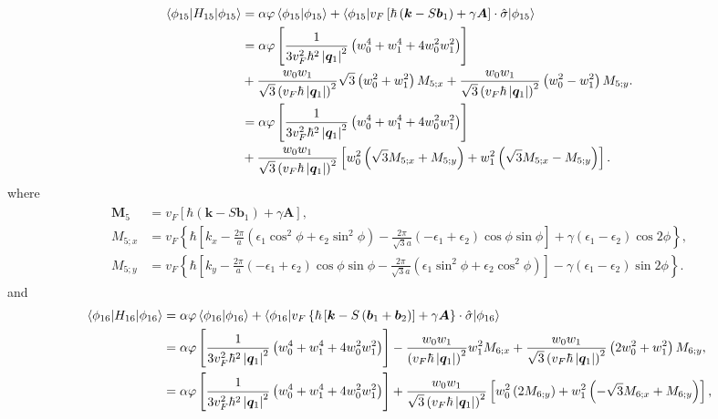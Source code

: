 \documentclass[10pt, oneside]{article}
\newcommand{\vph}{\varphi}
\newcommand{\p}[1]{\left(#1\right)}
\newcommand{\bb}[1]{\left[#1\right]}
\newcommand{\br}[1]{\left\{#1\right\}}
\newcommand{\bv}[1]{\left|#1\right|}
\begin{document}
\begin{align}
	\begin{split}
		\braket{\phi_{15} | H_{15} | \phi_{15}} & = \alpha \vph \braket{\phi_{15} | \phi_{15}} + \braket{\phi_{15} | v_{F} \bb{\hbar \p{\bm{k} - S\bm{b}_{1}}+ \gamma \bm{A}}\cdot \hat{\sigma}| \phi_{15}}   \\
		& = \alpha \vph \bb{\frac{1}{3 v_{F}^{2} \hbar^{2} \bv{\bm{q}_{1}}^{2} }\p{w_{0}^{4} + w_{1}^{4} + 4 w_{0}^{2} w_{1}^{2}}} \\
		&+ \frac{w_0 w_1}{\sqrt{3} \p{v_{F} \hbar \bv{\bm{q}_{1}}}^2} \sqrt{3} \p{w_{0}^{2} + w_{1}^{2}}M_{5;x} + \frac{w_0 w_1}{\sqrt{{3}}\p{v_{F} \hbar \bv{\bm{q}_1}}^2} \p{w_0^2 - w_1^2} M_{5;y}. \\
		& = \alpha \vph \bb{\frac{1}{3 v_{F}^{2} \hbar^{2} \bv{\bm{q}_{1}}^{2} }\p{w_{0}^{4} + w_{1}^{4} + 4 w_{0}^{2} w_{1}^{2}}} \\
		& + \frac{w_0 w_1}{\sqrt{{3}}\p{v_{F} \hbar \bv{\bm{q}_1}}^2}\bb{ w_0^2 \p{\sqrt{3} M_{5;x} + M_{5;y}} + w_1^2 \p{\sqrt{3} M_{5;x} - M_{5;y}}}.
	\end{split}
\end{align}
where 
\begin{align}
	\begin{split}
		\bm{M}_{5} & =  v_{F} \bb{\hbar \p{\bm{k} - S\bm{b}_{1}}+ \gamma \bm{A}}, \\
		M_{5;x} & = v_{F} \br{\hbar \bb{k_{x} - \frac{2 \pi}{a} \p{\epsilon_{1} \cos^{2}{\phi} + \epsilon_{2} \sin^{2}{\phi}} - \frac{2 \pi}{\sqrt{3} a}\p{ - \epsilon_{1} + \epsilon_{2} } \cos{\phi} \sin{\phi}} + \gamma \p{\epsilon_{1} - \epsilon_{2}} \cos{2 \phi}}, \\
		M_{5;y} & = v_{F} \br{\hbar \bb{k_{y} - \frac{2 \pi}{ a} \p{ - \epsilon_{1} + \epsilon_{2} } \cos{\phi	} \sin{\phi}  - \frac{2 \pi}{\sqrt{3} a}\p{\epsilon_{1} \sin^{2}{\phi} + \epsilon_{2} \cos^{2}{\phi}}} - \gamma \p{\epsilon_{1} - \epsilon_{2}} \sin{2 \phi}}.	
	\end{split}
\end{align}
and 
\begin{align}
	\begin{split}
		\braket{\phi_{16} | H_{16} | \phi_{16}} & = \alpha \vph \braket{\phi_{16} | \phi_{16}} + \braket{\phi_{16} | v_{F} \br{\hbar \bb {\bm{k} - S\p{\bm{b}_{1} + \bm{b}_{2}}}+ \gamma \bm{A}}\cdot \hat{\sigma}| \phi_{16}}  \\
		& = \alpha \vph \bb{\frac{1}{3 v_{F}^{2} \hbar^{2} \bv{\bm{q}_{1}}^{2}} \p{w_{0}^{4} + w_{1}^{4} + 4 w_{0}^{2} w_{1}^{2}}} - \frac{w_0 w_1}{\p{v_{F} \hbar \bv{\bm{q}_1}}^2}  w_1^2 M_{6;x} + \frac{w_0 w_1}{\sqrt{3} \p{v_{F} \hbar \bv{\bm{q}_1}}^2} \p{  2 w_0^2 + w_1^2} M_{6;y}, \\
		& = \alpha \vph \bb{\frac{1}{3 v_{F}^{2} \hbar^{2} \bv{\bm{q}_{1}}^{2}} \p{w_{0}^{4} + w_{1}^{4} + 4 w_{0}^{2} w_{1}^{2}}} + \frac{w_0 w_1}{\sqrt{3} \p{v_{F} \hbar \bv{\bm{q}_1}}^2} \bb{w_0^2 \p{ 2 M_{6;y}} + w_1^2 \p{- \sqrt{3} M_{6;x}  + M_{6;y}}},
	\end{split}
\end{align}
\end{document}

